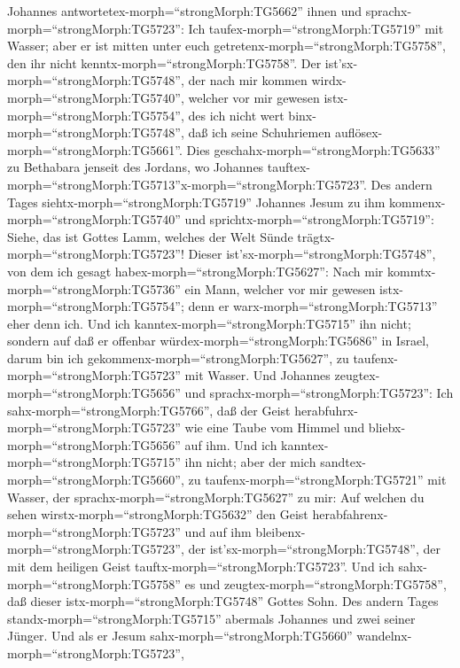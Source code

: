  Johannes antwortetex-morph=``strongMorph:TG5662'' ihnen
und sprachx-morph=``strongMorph:TG5723'': Ich
taufex-morph=``strongMorph:TG5719'' mit Wasser; aber er ist mitten unter
euch getretenx-morph=``strongMorph:TG5758'', den ihr nicht
kenntx-morph=``strongMorph:TG5758''.  Der
ist'sx-morph=``strongMorph:TG5748'', der nach mir kommen
wirdx-morph=``strongMorph:TG5740'', welcher vor mir gewesen
istx-morph=``strongMorph:TG5754'', des ich nicht wert
binx-morph=``strongMorph:TG5748'', daß ich seine Schuhriemen
auflösex-morph=``strongMorph:TG5661''.  Dies
geschahx-morph=``strongMorph:TG5633'' zu Bethabara jenseit des Jordans,
wo Johannes
tauftex-morph=``strongMorph:TG5713''x-morph=``strongMorph:TG5723''.
 Des andern Tages siehtx-morph=``strongMorph:TG5719''
Johannes Jesum zu ihm kommenx-morph=``strongMorph:TG5740'' und
sprichtx-morph=``strongMorph:TG5719'': Siehe, das ist Gottes Lamm,
welches der Welt Sünde trägtx-morph=``strongMorph:TG5723''!
 Dieser ist'sx-morph=``strongMorph:TG5748'', von dem ich
gesagt habex-morph=``strongMorph:TG5627'': Nach mir
kommtx-morph=``strongMorph:TG5736'' ein Mann, welcher vor mir gewesen
istx-morph=``strongMorph:TG5754''; denn er
warx-morph=``strongMorph:TG5713'' eher denn ich.  Und ich
kanntex-morph=``strongMorph:TG5715'' ihn nicht; sondern auf daß er
offenbar würdex-morph=``strongMorph:TG5686'' in Israel, darum bin ich
gekommenx-morph=``strongMorph:TG5627'', zu
taufenx-morph=``strongMorph:TG5723'' mit Wasser.  Und
Johannes zeugtex-morph=``strongMorph:TG5656'' und
sprachx-morph=``strongMorph:TG5723'': Ich
sahx-morph=``strongMorph:TG5766'', daß der Geist
herabfuhrx-morph=``strongMorph:TG5723'' wie eine Taube vom Himmel und
bliebx-morph=``strongMorph:TG5656'' auf ihm.  Und ich
kanntex-morph=``strongMorph:TG5715'' ihn nicht; aber der mich
sandtex-morph=``strongMorph:TG5660'', zu
taufenx-morph=``strongMorph:TG5721'' mit Wasser, der
sprachx-morph=``strongMorph:TG5627'' zu mir: Auf welchen du sehen
wirstx-morph=``strongMorph:TG5632'' den Geist
herabfahrenx-morph=``strongMorph:TG5723'' und auf ihm
bleibenx-morph=``strongMorph:TG5723'', der
ist'sx-morph=``strongMorph:TG5748'', der mit dem heiligen Geist
tauftx-morph=``strongMorph:TG5723''.  Und ich
sahx-morph=``strongMorph:TG5758'' es und
zeugtex-morph=``strongMorph:TG5758'', daß dieser
istx-morph=``strongMorph:TG5748'' Gottes Sohn.  Des andern
Tages standx-morph=``strongMorph:TG5715'' abermals Johannes und zwei
seiner Jünger.  Und als er Jesum
sahx-morph=``strongMorph:TG5660'' wandelnx-morph=``strongMorph:TG5723'',

